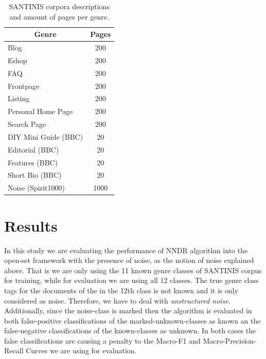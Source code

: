 \begin{table}
\center
\begin{tabular}{|l|l|}
\hline
\multicolumn{1}{|c|}{Genre} & \multicolumn{1}{c|}{Pages} \\
\hline
\multicolumn{1}{|l|}{Blog} & \multicolumn{1}{c|}{200}  \\
\multicolumn{1}{|l|}{Eshop} & \multicolumn{1}{c|}{200} \\
\multicolumn{1}{|l|}{FAQ} & \multicolumn{1}{c|}{200} \\
\multicolumn{1}{|l|}{Frontpage} & \multicolumn{1}{c|}{200} \\
\multicolumn{1}{|l|}{Listing} & \multicolumn{1}{c|}{200} \\
\multicolumn{1}{|l|}{Personal Home Page} & \multicolumn{1}{c|}{200} \\
\multicolumn{1}{|l|}{Search Page} & \multicolumn{1}{c|}{200} \\
\multicolumn{1}{|l|}{DIY Mini Guide (BBC)} & \multicolumn{1}{c|}{20} \\
\multicolumn{1}{|l|}{Editorial (BBC)} & \multicolumn{1}{c|}{20} \\
\multicolumn{1}{|l|}{Features (BBC)} & \multicolumn{1}{c|}{20} \\
\multicolumn{1}{|l|}{Short Bio (BBC)} & \multicolumn{1}{c|}{20} \\
\multicolumn{1}{|l|}{Noise (Spirit1000)} & \multicolumn{1}{c|}{1000}  \\
\hline
\end{tabular}
\caption {SANTINIS corpora descriptions and amount of pages per genre.}
\label{tbl:genre_tags}
\end{table}


\section{Results}\label{chap:word_embedding:sec:Experiments_Results}

In this study we are evaluating the performance of NNDR algorithm into the open-set framework with the presence of noise, as the notion of noise explained above. That is we are only using the 11 known genre classes of SANTINIS corpus for training, while for evaluation we are using all 12 classes. The true genre class tags for the documents of the in the 12th class is not known and it is only considered as noise. Therefore, we have to deal with \textit{unstructured noise}. Additionally, since the noise-class is marked then the algorithm is evaluated in both false-positive classifications of the marked-unknown-classes as known an the false-negative classifications of the known-classes as unknown. In both cases the false classifications are causing a penalty to the Macro-F1 and Macro-Precision-Recall Curves we are using for evaluation.

